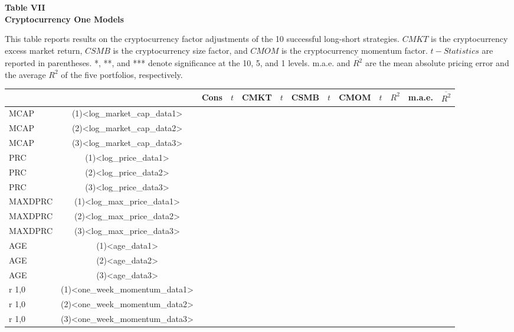 \documentclass{article}
\begin{document}
    \begin{center}
        \textbf{
        Table VII
        \\
        Cryptocurrency One Models
        }
        \begin{justify}
            \footnotesize{
                This table reports results on the cryptocurrency factor adjustments of the 10 successful long-short strategies. $CMKT$ is the cryptocurrency excess market return, $CSMB$ is the cryptocurrency size factor, and $CMOM$ is the cryptocurrency momentum factor. $t-Statistics$ are reported in parentheses. *, **, and *** denote significance at the 10, 5, and 1 levels. m.a.e. and $\overline{R^2}$ are the mean absolute pricing error and the average $R^2$ of the five portfolios, respectively.
            }
        \end{justify}
        \-
        \begin{tabular}{lcccccccccccr}
            \toprule
            & & Cons & $t$ & CMKT & $t$ & CSMB & $t$ & CMOM & $t$ & $R^2$ & m.a.e. & $\overline{R^2}$
            \\
            \midrule
            MCAP & (1)<log_market_cap_data1>
            \\
            MCAP & (2)<log_market_cap_data2>
            \\
            MCAP & (3)<log_market_cap_data3>
            \\
            PRC & (1)<log_price_data1>
            \\
            PRC & (2)<log_price_data2>
            \\
            PRC & (3)<log_price_data3>
            \\
            MAXDPRC & (1)<log_max_price_data1>
            \\
            MAXDPRC & (2)<log_max_price_data2>
            \\
            MAXDPRC & (3)<log_max_price_data3>
            \\
            AGE & (1)<age_data1>
            \\
            AGE & (2)<age_data2>
            \\
            AGE & (3)<age_data3>
            \\
            r 1,0 & (1)<one_week_momentum_data1>
            \\
            r 1,0 & (2)<one_week_momentum_data2>
            \\
            r 1,0 & (3)<one_week_momentum_data3>
            \\

\end{tabular}
\end{center}
\end{document}
